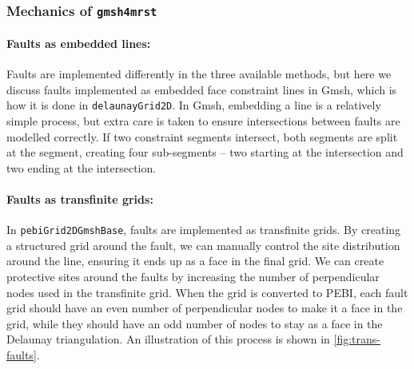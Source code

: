 \subsubsection{Mechanics of \texttt{gmsh4mrst}}
\paragraph{Faults as embedded lines:}
Faults are implemented differently in the three available methods, but here we discuss faults implemented as embedded face constraint lines in Gmsh, which is how it is done in \verb|delaunayGrid2D|. In Gmsh, embedding a line is a relatively simple process, but extra care is taken to ensure intersections between faults are modelled correctly. If two constraint segments intersect, both segments are split at the segment, creating four sub-segments -- two starting at the intersection and two ending at the intersection. %

\paragraph{Faults as transfinite grids:}
In \verb|pebiGrid2DGmshBase|, faults are implemented as transfinite grids. By creating a structured grid around the fault, we can manually control the site distribution around the line, ensuring it ends up as a face in the final grid. We can create protective sites around the faults by increasing the number of perpendicular nodes used in the transfinite grid. When the grid is converted to PEBI, each fault grid should have an even number of perpendicular nodes to make it a face in the grid, while they should have an odd number of nodes to stay as a face in the Delaunay triangulation. An illustration of this process is shown in \autoref{fig:trans-faults}.

